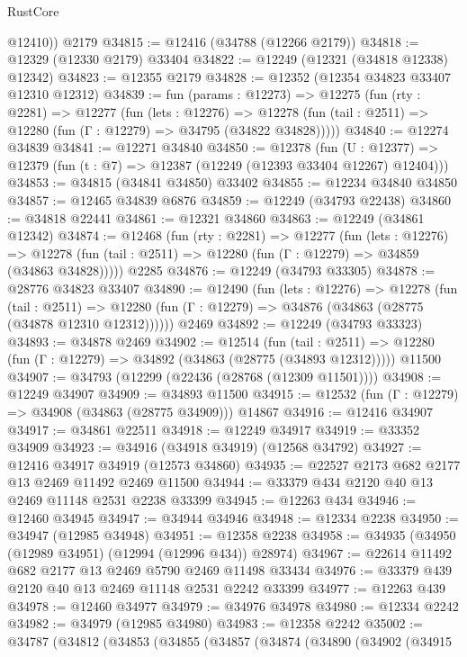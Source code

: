 \begin{lexlean}{RustCore}
\begin{coremodule}
        @12410))
    @2179
@34815 := @12416 (@34788 (@12266 @2179))
@34818 := @12329 (@12330 @2179) @33404
@34822 := @12249 (@12321 (@34818 @12338) @12342)
@34823 := @12355 @2179
@34828 := @12352 (@12354 @34823 @33407 @12310 @12312)
@34839 := fun (params : @12273) =>
  @12275
    (fun (rty : @2281) =>
    @12277
      (fun (lets : @12276) =>
      @12278 (fun (tail : @2511) => @12280 (fun (Γ : @12279) => @34795 (@34822 @34828)))))
@34840 := @12274 @34839
@34841 := @12271 @34840
@34850 := @12378
    (fun (U : @12377) => @12379 (fun (t : @7) => @12387 (@12249 (@12393 @33404 @12267) @12404)))
@34853 := @34815 (@34841 @34850) @33402
@34855 := @12234 @34840 @34850
@34857 := @12465 @34839 @6876
@34859 := @12249 (@34793 @22438)
@34860 := @34818 @22441
@34861 := @12321 @34860
@34863 := @12249 (@34861 @12342)
@34874 := @12468
    (fun (rty : @2281) =>
    @12277
      (fun (lets : @12276) =>
      @12278 (fun (tail : @2511) => @12280 (fun (Γ : @12279) => @34859 (@34863 @34828)))))
    @2285
@34876 := @12249 (@34793 @33305)
@34878 := @28776 @34823 @33407
@34890 := @12490
    (fun (lets : @12276) =>
    @12278
      (fun (tail : @2511) =>
      @12280 (fun (Γ : @12279) => @34876 (@34863 (@28775 (@34878 @12310 @12312))))))
    @2469
@34892 := @12249 (@34793 @33323)
@34893 := @34878 @2469
@34902 := @12514
    (fun (tail : @2511) => @12280 (fun (Γ : @12279) => @34892 (@34863 (@28775 (@34893 @12312)))))
    @11500
@34907 := @34793 (@12299 (@22436 (@28768 (@12309 @11501))))
@34908 := @12249 @34907
@34909 := @34893 @11500
@34915 := @12532 (fun (Γ : @12279) => @34908 (@34863 (@28775 @34909))) @14867
@34916 := @12416 @34907
@34917 := @34861 @22511
@34918 := @12249 @34917
@34919 := @33352 @34909
@34923 := @34916 (@34918 @34919) (@12568 @34792)
@34927 := @12416 @34917 @34919 (@12573 @34860)
@34935 := @22527 @2173 @682 @2177 @13 @2469 @11492 @2469 @11500
@34944 := @33379 @434 @2120 @40 @13 @2469 @11148 @2531 @2238 @33399
@34945 := @12263 @434
@34946 := @12460 @34945
@34947 := @34944 @34946
@34948 := @12334 @2238
@34950 := @34947 (@12985 @34948)
@34951 := @12358 @2238
@34958 := @34935 (@34950 (@12989 @34951) (@12994 (@12996 @434)) @28974)
@34967 := @22614 @11492 @682 @2177 @13 @2469 @5790 @2469 @11498 @33434
@34976 := @33379 @439 @2120 @40 @13 @2469 @11148 @2531 @2242 @33399
@34977 := @12263 @439
@34978 := @12460 @34977
@34979 := @34976 @34978
@34980 := @12334 @2242
@34982 := @34979 (@12985 @34980)
@34983 := @12358 @2242
@35002 := @34787
    (@34812
      (@34853
        (@34855
          (@34857
            (@34874
              (@34890
                (@34902
                  (@34915

\end{coremodule}
\end{lexlean}
